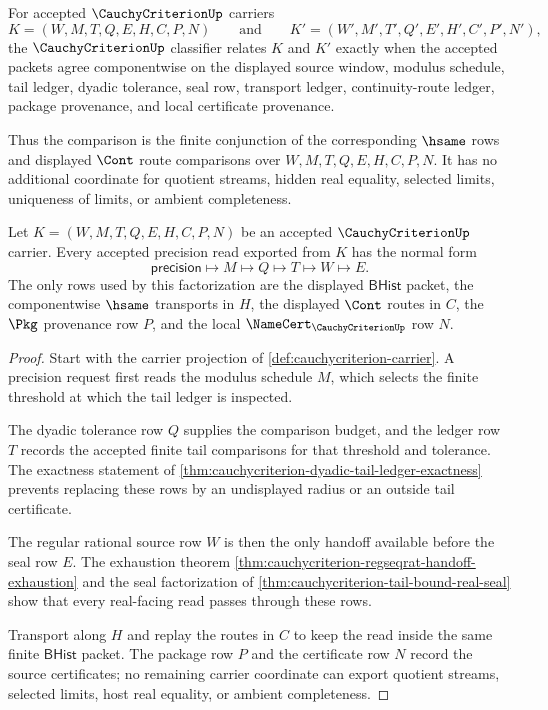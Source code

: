 \begin{definition}
\label{def:cauchycriterion-classifier}
For accepted $\CauchyCriterionUp$ carriers
$$
K=(W,M,T,Q,E,H,C,P,N)
\qquad\text{and}\qquad
K'=(W',M',T',Q',E',H',C',P',N'),
$$
the $\CauchyCriterionUp$ classifier relates $K$ and $K'$ exactly when the accepted packets agree componentwise on the displayed source window, modulus schedule, tail ledger, dyadic tolerance, seal row, transport ledger, continuity-route ledger, package provenance, and local certificate provenance.

Thus the comparison is the finite conjunction of the corresponding $\hsame$ rows and displayed $\Cont$ route comparisons over $W,M,T,Q,E,H,C,P,N$. It has no additional coordinate for quotient streams, hidden real equality, selected limits, uniqueness of limits, or ambient completeness.
\end{definition}

\begin{theorem}
\label{thm:cauchycriterion-precision-route-normal-form}
Let $K=(W,M,T,Q,E,H,C,P,N)$ be an accepted $\CauchyCriterionUp$ carrier. Every accepted precision read exported from $K$ has the normal form
$$
\mathsf{precision}
\longmapsto
M
\longmapsto
Q
\longmapsto
T
\longmapsto
W
\longmapsto
E.
$$
The only rows used by this factorization are the displayed $\mathsf{BHist}$ packet, the componentwise $\hsame$ transports in $H$, the displayed $\Cont$ routes in $C$, the $\Pkg$ provenance row $P$, and the local $\NameCert_{\CauchyCriterionUp}$ row $N$.
\end{theorem}
\begin{proof}
Start with the carrier projection of \autoref{def:cauchycriterion-carrier}. A precision request first reads the modulus schedule $M$, which selects the finite threshold at which the tail ledger is inspected.

The dyadic tolerance row $Q$ supplies the comparison budget, and the ledger row $T$ records the accepted finite tail comparisons for that threshold and tolerance. The exactness statement of \autoref{thm:cauchycriterion-dyadic-tail-ledger-exactness} prevents replacing these rows by an undisplayed radius or an outside tail certificate.

The regular rational source row $W$ is then the only handoff available before the seal row $E$. The exhaustion theorem \autoref{thm:cauchycriterion-regseqrat-handoff-exhaustion} and the seal factorization of \autoref{thm:cauchycriterion-tail-bound-real-seal} show that every real-facing read passes through these rows.

Transport along $H$ and replay the routes in $C$ to keep the read inside the same finite $\mathsf{BHist}$ packet. The package row $P$ and the certificate row $N$ record the source certificates; no remaining carrier coordinate can export quotient streams, selected limits, host real equality, or ambient completeness.
\end{proof}

